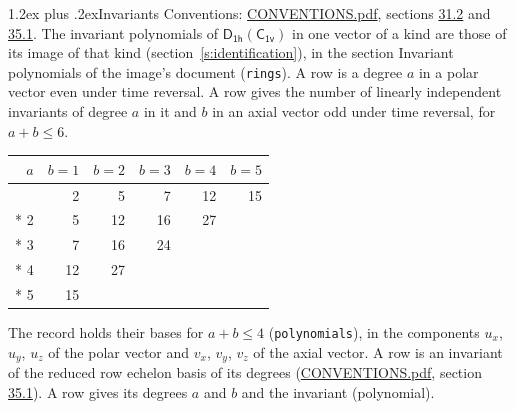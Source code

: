 \documentclass[10pt,a4paper]{article}
\makeatletter
\renewcommand\section{\@startsection{section}{1}{\z@}{-3ex plus -1ex minus -.2ex}%
  {1.2ex plus .2ex}{\normalfont\large\sffamily\bfseries\color{parttitle}}}
\numberwithin{equation}{section}
\newcommand{\grp}[1]{\mathsf{#1}}
\makeatother
\begin{document}
\section{Invariants}\label{s:invariants}
Conventions: \href{../../CONVENTIONS.pdf}{CONVENTIONS.pdf}, sections \href{../../CONVENTIONS.pdf\#conv.31.2}{31.2} and \href{../../CONVENTIONS.pdf\#conv.35.1}{35.1}.
The invariant polynomials of $\grp{D_{1h}}(\grp{C_{1v}})$ in one vector of a kind are those of its image of that kind (section~\ref{s:identification}), in the section Invariant polynomials of the image's document (\texttt{rings}).
\leavevmode\label{n:index.degree.polar}\label{n:index.degree.axial}A row is a degree $a$ in a polar vector even under time reversal. A row gives the number of linearly independent invariants of degree $a$ in it and $b$ in an axial vector odd under time reversal, for $a + b \le 6$.
{\small\begin{longtable}{@{}rrrrrr@{}}\toprule
$a$ & $b = 1$ & $b = 2$ & $b = 3$ & $b = 4$ & $b = 5$\\\midrule\endhead
\bottomrule\endfoot\endlastfoot
1 & 2 & 5 & 7 & 12 & 15\\*
2 & 5 & 12 & 16 & 27 & \\*
3 & 7 & 16 & 24 &  & \\*
4 & 12 & 27 &  &  & \\*
5 & 15 &  &  &  & \\
\bottomrule\end{longtable}}
\leavevmode\label{n:local.component.polar}\label{n:local.component.axial}The record holds their bases for $a + b \le 4$ (\texttt{polynomials}), in the components $u_{x}$, $u_{y}$, $u_{z}$ of the polar vector and $v_{x}$, $v_{y}$, $v_{z}$ of the axial vector. \label{n:head.polynomial}A row is an invariant of the reduced row echelon basis of its degrees (\href{../../CONVENTIONS.pdf}{CONVENTIONS.pdf}, section \href{../../CONVENTIONS.pdf\#conv.35.1}{35.1}). A row gives its degrees $a$ and $b$ and the invariant (polynomial).
\end{document}
